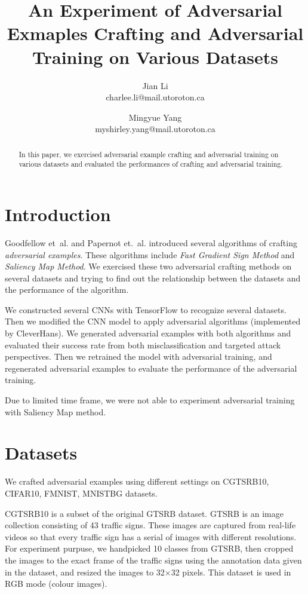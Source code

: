 \documentclass{article}
\begin{document}
\title{An Experiment of Adversarial Exmaples Crafting and Adversarial Training on Various Datasets}
\author{Jian Li \\ charlee.li@mail.utoroton.ca \and Mingyue Yang \\ myshirley.yang@mail.utoroton.ca}
\maketitle

\begin{abstract}
In this paper, we exercised adversarial example crafting and adversarial training on various datasets and evaluated the performances of crafting and adversarial training.
\end{abstract}

\section{Introduction}

Goodfellow et\ al. and Papernot et.\ al. introduced several algorithms of crafting \emph{adversarial examples}.
These algorithms include \emph{Fast Gradient Sign Method}\cite{goodfellow2015} and \emph{Saliency Map Method}\cite{papernot2015}.
We exercised these two adversarial crafting methods on several datasets and trying to find out the relationship between the datasets and the performance of the algorithm.

We constructed several CNNs with TensorFlow\cite{tensorflow} to recognize several datasets.
Then we modified the CNN model to apply adversarial algorithms (implemented by CleverHans\cite{cleverhans}).
We generated adversarial examples with both algorithms and evaluated their success rate from both misclassification and targeted attack perspectives.
Then we retrained the model with adversarial training, and regenerated adversarial examples to evaluate the performance of the adversarial training.

Due to limited time frame, we were not able to experiment adversarial training with Saliency Map method.

\section{Datasets}

We crafted adversarial examples using different settings on CGTSRB10, CIFAR10, FMNIST, MNISTBG datasets. 

CGTSRB10 is a subset of the original GTSRB\cite{gtsrb} dataset. GTSRB is an image collection consisting of 43 traffic signs. 
These images are captured from real-life videos so that every traffic sign has a serial of images with different resolutions.
For experiment purpuse, we handpicked 10 classes from GTSRB, then cropped the images to the exact frame of the traffic signs
using the annotation data given in the dataset, and resized the images to 32$\times$32 pixels. This dataset is used in RGB mode (colour images).
\end{document}
